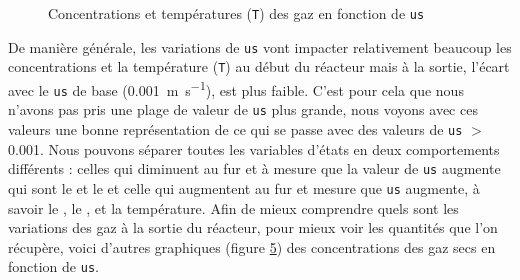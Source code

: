 \documentclass[11pt]{report}
\begin{document}
      \begin{figure}[ht]
        \centering
        \begin{subfigure}[t]{0.325\textwidth}
          \centering
          
          \caption{}
          \label{graph:con:2:us:CH4}
        \end{subfigure}
        \hfill
        \begin{subfigure}[t]{0.325\textwidth}
          \centering
          
          \caption{}
          \label{graph:con:2:us:H2}
        \end{subfigure}
        \hfill
        \begin{subfigure}[t]{0.325\textwidth}
          \centering
          
          \caption{}
          \label{graph:con:2:us:CO}
        \end{subfigure}
        \hfill
        \begin{subfigure}[t]{0.325\textwidth}
          \centering
          
          \caption{}
          \label{graph:con:2:us:CO2}
        \end{subfigure}
        \caption{Concentrations et températures (\texttt{T}) des gaz en fonction de \texttt{us}}
        \label{graph:con:2:us}
      \end{figure}
      \par
      De manière générale, les variations de \verb|us| vont impacter relativement beaucoup 
      les concentrations et la température (\verb|T|) au début du réacteur mais à la sortie,
      l'écart avec le \verb|us| de base (\SI{0.001}{\meter\per\second}), est plus faible. C'est pour cela que 
      nous n'avons pas pris une plage de valeur de \verb|us| plus grande, nous voyons avec 
      ces valeurs une bonne représentation de ce qui se passe avec des valeurs de 
      \verb|us| $>$ 0.001. Nous pouvons séparer toutes les variables d'états en deux comportements 
      différents : celles qui diminuent au fur et à mesure que la valeur de \verb|us| augmente
      qui sont le  et le  et celle qui augmentent au fur et mesure que \verb|us| augmente, 
      à savoir le , le , et la température.
      Afin de mieux comprendre quels sont les variations des gaz à la sortie du réacteur, 
      pour mieux voir les quantités que l'on récupère,
      voici d'autres graphiques (figure \ref{graph:con:2:us}) des concentrations des gaz secs en fonction de \verb|us|.
    
\end{document}
